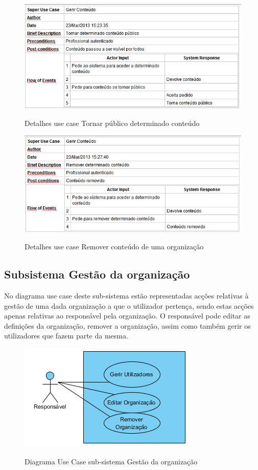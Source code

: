 ﻿\documentclass[12pt,a4paper]{article}
\begin{document}
\begin{figure}[h!]
\centering
\includegraphics[scale=0.7]{d_usecase/tornarpublico}
\label{usecase}
\caption{Detalhes use case Tornar público determinado conteúdo}
\end{figure}

\begin{figure}[h!]
\centering
\includegraphics[scale=0.7]{d_usecase/removerconteudo}
\label{usecase}
\caption{Detalhes use case Remover conteúdo de uma organização}
\end{figure}


\clearpage
\clearpage
\subsection{Subsistema Gestão da organização}
No diagrama use case deste sub-sistema estão representadas acções relativas à gestão de uma dada organização a que o utilizador pertença, sendo estas acções apenas relativas ao responsável pela organização. O responsável pode editar as definições da organização, remover a organização, assim como também gerir os utilizadores que fazem parte da mesma.\\

\begin{figure}[h!]
\centering
\includegraphics[scale=1]{usecase/R_GerirOrganizacao}
\label{usecase}
\caption{Diagrama Use Case sub-sistema Gestão da organização}
\end{figure}
\end{document}
